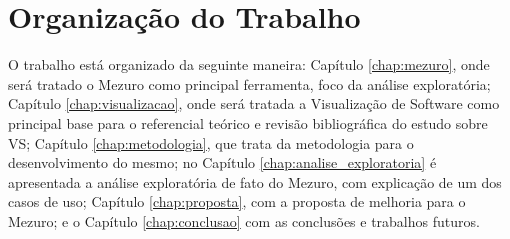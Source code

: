 \section{Organização do Trabalho}

O trabalho está organizado da seguinte maneira: Capítulo \ref{chap:mezuro}, onde
será tratado o Mezuro como principal ferramenta, foco da análise exploratória;
Capítulo \ref{chap:visualizacao}, onde será tratada a Visualização de Software
como principal base para o referencial teórico e revisão bibliográfica do estudo
sobre VS; Capítulo \ref{chap:metodologia}, que trata da metodologia para o
desenvolvimento do mesmo; no Capítulo \ref{chap:analise_exploratoria} é
apresentada a análise exploratória de fato do Mezuro, com explicação de um dos
casos de uso; Capítulo \ref{chap:proposta}, com a proposta de melhoria para o
Mezuro; e o Capítulo \ref{chap:conclusao} com as conclusões e trabalhos futuros.
